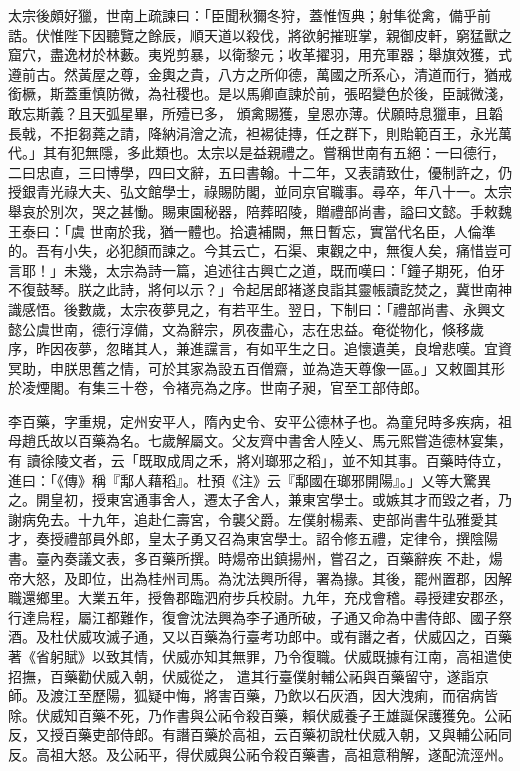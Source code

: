 \begin{pinyinscope}
 太宗後頗好獵，世南上疏諫曰：「臣聞秋獮冬狩，蓋惟恆典；射隼從禽，備乎前誥。伏惟陛下因聽覽之餘辰，順天道以殺伐，將欲躬摧班掌，親御皮軒，窮猛獸之窟穴，盡逸材於林藪。夷兇剪暴，以衛黎元；收革擢羽，用充軍器；舉旗效獲，式遵前古。然黃屋之尊，金輿之貴，八方之所仰德，萬國之所系心，清道而行，猶戒銜橛，斯蓋重慎防微，為社稷也。是以馬卿直諫於前，張昭變色於後，臣誠微淺，敢忘斯義？且天弧星畢，所殪已多，
 頒禽賜獲，皇恩亦薄。伏願時息獵車，且韜長戟，不拒芻蕘之請，降納涓澮之流，袒裼徒摶，任之群下，則貽範百王，永光萬代。」其有犯無隱，多此類也。太宗以是益親禮之。嘗稱世南有五絕：一曰德行，二曰忠直，三曰博學，四曰文辭，五曰書翰。十二年，又表請致仕，優制許之，仍授銀青光祿大夫、弘文館學士，祿賜防閣，並同京官職事。尋卒，年八十一。太宗舉哀於別次，哭之甚慟。賜東園秘器，陪葬昭陵，贈禮部尚書，謚曰文懿。手敕魏王泰曰：「虞
 世南於我，猶一體也。拾遺補闕，無日暫忘，實當代名臣，人倫準的。吾有小失，必犯顏而諫之。今其云亡，石渠、東觀之中，無復人矣，痛惜豈可言耶！」未幾，太宗為詩一篇，追述往古興亡之道，既而嘆曰：「鐘子期死，伯牙不復鼓琴。朕之此詩，將何以示？」令起居郎褚遂良詣其靈帳讀訖焚之，冀世南神識感悟。後數歲，太宗夜夢見之，有若平生。翌日，下制曰：「禮部尚書、永興文懿公虞世南，德行淳備，文為辭宗，夙夜盡心，志在忠益。奄從物化，倏移歲
 序，昨因夜夢，忽睹其人，兼進讜言，有如平生之日。追懷遺美，良增悲嘆。宜資冥助，申朕思舊之情，可於其家為設五百僧齋，並為造天尊像一區。」又敕圖其形於凌煙閣。有集三十卷，令褚亮為之序。世南子昶，官至工部侍郎。



 李百藥，字重規，定州安平人，隋內史令、安平公德林子也。為童兒時多疾病，祖母趙氏故以百藥為名。七歲解屬文。父友齊中書舍人陸乂、馬元熙嘗造德林宴集，有
 讀徐陵文者，云「既取成周之禾，將刈瑯邪之稻」，並不知其事。百藥時侍立，進曰：「《傳》稱『鄅人藉稻』。杜預《注》云『鄅國在瑯邪開陽』。」乂等大驚異之。開皇初，授東宮通事舍人，遷太子舍人，兼東宮學士。或嫉其才而毀之者，乃謝病免去。十九年，追赴仁壽宮，令襲父爵。左僕射楊素、吏部尚書牛弘雅愛其才，奏授禮部員外郎，皇太子勇又召為東宮學士。詔令修五禮，定律令，撰陰陽書。臺內奏議文表，多百藥所撰。時煬帝出鎮揚州，嘗召之，百藥辭疾
 不赴，煬帝大怒，及即位，出為桂州司馬。為沈法興所得，署為掾。其後，罷州置郡，因解職還鄉里。大業五年，授魯郡臨泗府步兵校尉。九年，充戍會稽。尋授建安郡丞，行達烏程，屬江都難作，復會沈法興為李子通所破，子通又命為中書侍郎、國子祭酒。及杜伏威攻滅子通，又以百藥為行臺考功郎中。或有譖之者，伏威囚之，百藥著《省躬賦》以致其情，伏威亦知其無罪，乃令復職。伏威既據有江南，高祖遣使招撫，百藥勸伏威入朝，伏威從之，
 遣其行臺僕射輔公祏與百藥留守，遂詣京師。及渡江至歷陽，狐疑中悔，將害百藥，乃飲以石灰酒，因大洩痢，而宿病皆除。伏威知百藥不死，乃作書與公祏令殺百藥，賴伏威養子王雄誕保護獲免。公祏反，又授百藥吏部侍郎。有譖百藥於高祖，云百藥初說杜伏威入朝，又與輔公祏同反。高祖大怒。及公祏平，得伏威與公祏令殺百藥書，高祖意稍解，遂配流涇州。




\end{pinyinscope}
